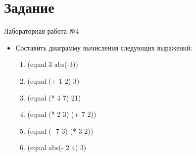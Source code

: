 \newpage
\section*{Задание}
\Large{Лабораторная работа №4}

\begin{itemize}
	\item Составить диаграмму вычисления следующих выражений:
		\begin{enumerate}
			\item (equal 3 abs(-3))
			\item (equal (+ 1 2) 3)
			\item (equal (* 4 7) 21)
			\item (equal (* 2 3) (+ 7 2))
			\item (equal (- 7 3) (* 3 2))
			\item (equal abs(- 2 4) 3)
		\end{enumerate}
\end{itemize}